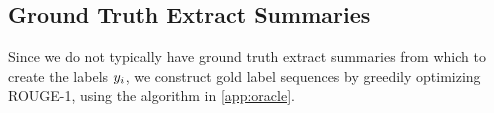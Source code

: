 \subsection{Ground Truth Extract Summaries}
Since we do not typically have ground truth extract summaries from which to
create the labels $\slabel_i$, we construct gold label sequences 
by greedily optimizing ROUGE-1, using the algorithm in \autoref{app:oracle}.
%
%
